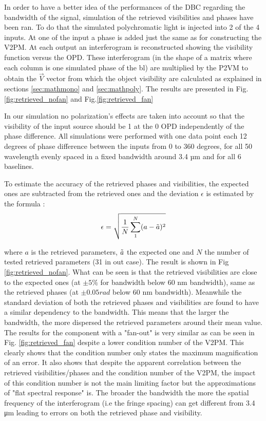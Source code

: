 In order to have a better idea of the performances of the DBC regarding the bandwidth of the signal, simulation of the retrieved visibilities and phases have been ran. To do that the simulated polychromatic light is injected into 2 of the 4 inputs. At one of the input a phase is added just the same as for constructing the V2PM. At each output an interferogram is reconstructed showing the visibility function versus the OPD. These interferogram (in the shape of a matrix where each column is one simulated phase of the \gls{bl}) are multiplied by the P2VM to obtain the $\vec{V}$ vector from which the object visibility are calculated as explained in sections \ref{sec:mathmono} and \ref{sec:mathpoly}. The results are presented in Fig.\ref{fig:retrieved_nofan} and Fig.\ref{fig:retrieved_fan}

In our simulation no polarization's effects are taken into account so that the visibility of the input source should be 1 at the 0 OPD independently of the phase difference. All simulations were performed with one data point each 12 degrees of phase difference between the inputs from 0 to 360 degrees, for all 50 wavelength evenly spaced in a fixed bandwidth around 3.4 µm and for all 6 baselines. 

To estimate the accuracy of the retrieved phases and visibilities, the expected ones are subtracted from the retrieved ones and the deviation $\epsilon$ is estimated by the formula :
\begin{equation}\label{eq:deviation}
\epsilon = \sqrt{\frac{1}{N}\sum_{1}^{N}(a-\Tilde{a})^2}
\end{equation}

where $a$ is the retrieved parameters, $\Tilde{a}$ the expected one and $N$ the number of tested retrieved parameters (31 in out case).
The result is shown in Fig \ref{fig:retrieved_nofan}. What can be seen is that the retrieved visibilities are close to the expected ones (at $\pm5\%$ for bandwidth below 60 nm bandwidth), same as the retrieved phases (at $\pm 0.05 rad$ below 60 nm bandwidth).
Meanwhile the standard deviation of both the retrieved phases and visibilities are found to have a similar dependency to the bandwidth. This means that the larger the bandwidth, the more dispersed the retrieved parameters around their mean value. 
The results for the component with a "fan-out" is very similar as can be seen in Fig. \ref{fig:retrieved_fan} despite a lower condition number of the V2PM. This clearly shows that the condition number only states the maximum magnification of an error. It also shows that despite the apparent correlation between the retrieved visibilities/phases and the condition number of the V2PM, the impact of this condition number is not the main limiting factor but the approximations of "flat spectral response" is. The broader the bandwidth the more the spatial frequency of the interferogram (i.e the fringe spacing) can get different from 3.4 \si{\micro\meter} leading to errors on both the retrieved phase and visibility. 


